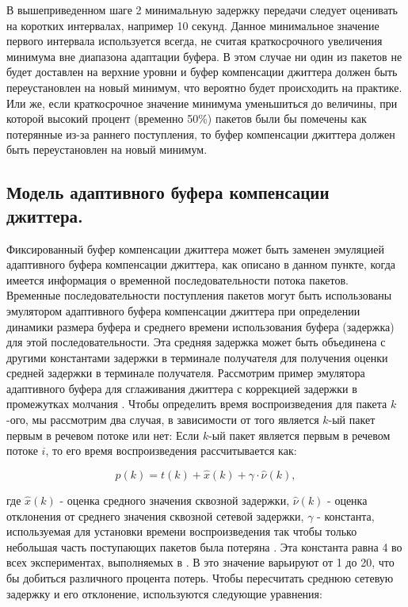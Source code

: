 В вышеприведенном шаге 2 минимальную задержку передачи следует оценивать на коротких интервалах, например 10 секунд. Данное минимальное значение первого интервала используется всегда, не считая краткосрочного увеличения минимума вне диапазона адаптации буфера. В этом случае ни один из пакетов не будет доставлен на верхние уровни и буфер компенсации джиттера должен быть переустановлен на новый минимум, что вероятно будет происходить на практике. Или же, если краткосрочное значение минимума уменьшиться до величины, при которой высокий процент (временно 50\%) пакетов были бы помечены как потерянные из-за раннего поступления, то буфер компенсации джиттера должен быть переустановлен на новый минимум.

\subsection{Модель адаптивного буфера компенсации джиттера.} \label{sect3_4_2}

Фиксированный буфер компенсации джиттера может быть заменен эмуляцией адаптивного буфера компенсации джиттера, как описано в данном пункте, когда имеется информация о временной последовательности потока пакетов. 
Временные последовательности поступления пакетов могут быть использованы эмулятором адаптивного буфера компенсации джиттера при определении динамики размера буфера и среднего времени использования буфера (задержка) для этой последовательности. Эта средняя задержка может быть объединена с другими константами задержки в терминале получателя для получения оценки средней задержки в терминале получателя. 
Рассмотрим пример эмулятора адаптивного буфера для сглаживания джиттера с коррекцией задержки в промежутках молчания \cite{Ramjee}. Чтобы определить время воспроизведения для пакета $k$-ого, мы рассмотрим два случая, в зависимости от того является $k$-ый пакет первым в речевом потоке или нет:
Если $k$-ый пакет является первым в речевом потоке $i$, то его время воспроизведения рассчитывается как:

\begin{equation}\label{eq3:playout}
p(k)=t(k)+\hat{x}(k)+\gamma\cdot\hat{\nu}(k),
\end{equation}

\noindent где $\hat{x}(k)$ - оценка средного значения сквозной задержки, $\hat{\nu}(k)$ - оценка отклонения от среднего значения сквозной сетевой задержки, $\gamma$ - константа, используемая для установки времени воспроизведения так чтобы только небольшая часть поступающих пакетов была потеряна \cite{Ramjee}. Эта константа равна 4 во всех экспериментах, выполняемых в \cite{Ramjee}. В \cite{Moon} это значение варьируют от 1 до 20, что бы добиться различного процента потерь. Чтобы пересчитать среднюю сетевую задержку и его отклонение, используются следующие уравнения:

